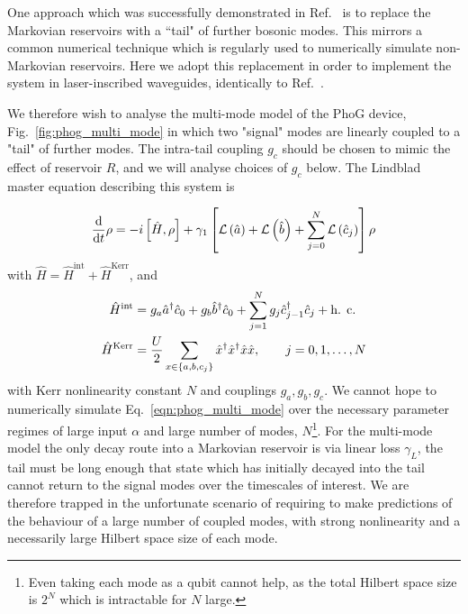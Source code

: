 One approach which was successfully demonstrated in Ref.~\cite{Mukherjee2017} is to replace the Markovian reservoirs with a ``tail" of further bosonic modes. This mirrors a common numerical technique  which is regularly used to numerically simulate non-Markovian reservoirs. Here we adopt this replacement in order to implement the system in laser-inscribed waveguides, identically to Ref.~\cite{Mukherjee}. 

We therefore wish to analyse the multi-mode model of the PhoG device, Fig.~\ref{fig:phog_multi_mode} in which two "signal" modes are linearly coupled to a "tail" of further modes. The intra-tail coupling $g_c$ should be chosen to mimic the effect of reservoir $R$, and we will analyse choices of $g_c$ below. The Lindblad master equation describing this system is

\begin{equation}\label{eqn:phog_multi_mode}
\frac{\mathrm{d}}{\mathrm{d}t} \rho = - i \left[\hat{H}, \rho\right] + \gamma_1 \left[\mathcal{L}\left(\hat{a}\right) + \mathcal{L}\left(\hat{b}\right) + \sum_{j=0}^N \mathcal{L}\left(\hat{c}_j\right) \right] \rho
\end{equation}
with $\hat{H} = \hat{H}^{\text{int}} + \hat{H}^{\text{Kerr}}$, and
\begin{align}
\hat{H}^{\text{int}} &= g_a \hat{a}^\dagger \hat{c}_0 + g_b \hat{b}^\dagger \hat{c}_0 + \sum_{j=1}^N g_j \hat{c}_{j-1}^\dagger \hat{c}_j + \hc \notag \\
%
\hat{H}^{\text{Kerr}} &= \frac{U}{2} \sum_{x \in \left\{a, b, c_j\right\}} \hat{x}^\dagger \hat{x}^\dagger \hat{x} \hat{x}, \qq{} j = 0, 1, \dots, N
\end{align}
with Kerr nonlinearity constant $N$ and couplings $g_a, g_b, g_c$. We cannot hope to numerically simulate Eq.~\ref{eqn:phog_multi_mode} over the necessary parameter regimes of large input $\alpha$ and large number of modes, $N$\footnote{Even taking each mode as a qubit cannot help, as the total Hilbert space size is $2^{N}$ which is intractable for $N$ large.}. For the multi-mode model the only decay route into a Markovian reservoir is via linear loss $\gamma_L$, the tail must be long enough that state which has initially decayed into the tail cannot return to the signal modes over the timescales of interest. We are therefore trapped in the unfortunate scenario of requiring to make predictions of the behaviour of a large number of coupled modes, with strong nonlinearity and a necessarily large Hilbert space size of each mode. 

